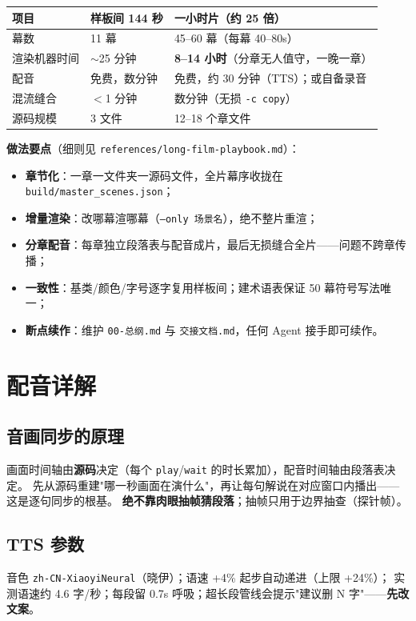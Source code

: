 \documentclass[12pt,a4paper]{ctexart}
\newcommand{\code}[1]{\texttt{\small #1}}
\begin{document}
\begin{center}
\begin{tabular}{p{3.2cm} p{3.6cm} p{7.2cm}}
\hline
\rowcolor{ptbg} 项目 & 样板间 144 秒 & 一小时片（约 25 倍） \\
\hline
幕数 & 11 幕 & 45--60 幕（每幕 40--80s） \\
渲染机器时间 & $\sim$25 分钟 & \textbf{8--14 小时}（分章无人值守，一晚一章） \\
配音 & 免费，数分钟 & 免费，约 30 分钟（TTS）；或自备录音 \\
混流缝合 & $<$1 分钟 & 数分钟（无损 \code{-c copy}） \\
源码规模 & 3 文件 & 12--18 个章文件 \\
\hline
\end{tabular}
\end{center}

\textbf{做法要点}（细则见 \code{references/long-film-playbook.md}）：
\begin{itemize}
    \item \textbf{章节化}：一章一文件夹一源码文件，全片幕序收拢在 \code{build/master\_scenes.json}；
    \item \textbf{增量渲染}：改哪幕渲哪幕（\code{--only 场景名}），绝不整片重渲；
    \item \textbf{分章配音}：每章独立段落表与配音成片，最后无损缝合全片——问题不跨章传播；
    \item \textbf{一致性}：基类/颜色/字号逐字复用样板间；建术语表保证 50 幕符号写法唯一；
    \item \textbf{断点续作}：维护 \code{00-总纲.md} 与 \code{交接文档.md}，任何 Agent 接手即可续作。
\end{itemize}

\section{配音详解}

\subsection{音画同步的原理}
画面时间轴由\textbf{源码}决定（每个 \code{play}/\code{wait} 的时长累加），配音时间轴由段落表决定。
先从源码重建"哪一秒画面在演什么"，再让每句解说在对应窗口内播出——这是逐句同步的根基。
\textbf{绝不靠肉眼抽帧猜段落}；抽帧只用于边界抽查（探针帧）。

\subsection{TTS 参数}
音色 \code{zh-CN-XiaoyiNeural}（晓伊）；语速 +4\% 起步自动递进（上限 +24\%）；
实测语速约 4.6 字/秒；每段留 0.7s 呼吸；超长段管线会提示"建议删 N 字"——\textbf{先改文案}。
\end{document}
